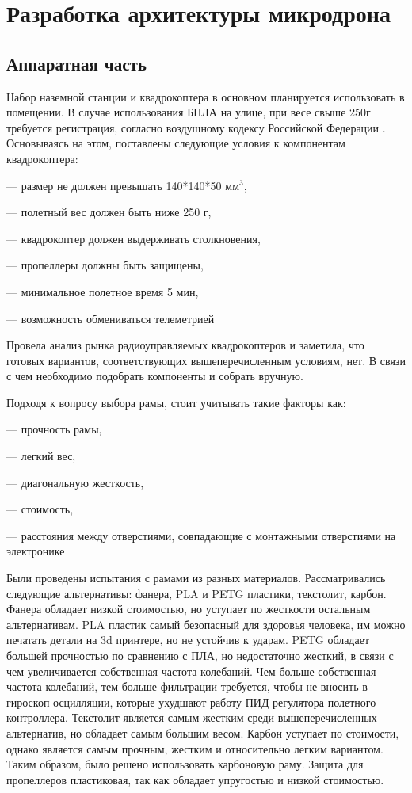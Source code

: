 
\section{Разработка архитектуры микродрона}
\subsection{Аппаратная часть}

Набор наземной станции и квадрокоптера в основном планируется использовать в помещении. В случае использования БПЛА на улице, при весе свыше 250г требуется регистрация, согласно воздушному кодексу Российской Федерации\cite{ivp} . Основываясь на этом, поставлены следующие условия к компонентам квадрокоптера:

--- размер не должен превышать 140*140*50 \(мм^3\),

--- полетный вес должен быть ниже 250 г,

--- квадрокоптер должен выдерживать столкновения,

--- пропеллеры должны быть защищены,

--- минимальное полетное время 5 мин,

--- возможность обмениваться телеметрией

Провела анализ рынка радиоуправляемых квадрокоптеров и заметила, что готовых вариантов, соответствующих вышеперечисленным условиям, нет. В связи с чем необходимо подобрать компоненты и собрать вручную.

Подходя к вопросу выбора рамы, стоит учитывать такие факторы как:

--- прочность рамы,

--- легкий вес,

--- диагональную жесткость,

--- стоимость,

--- расстояния между отверстиями, совпадающие с монтажными отверстиями на электронике

Были проведены испытания с рамами из разных материалов. Рассматривались следующие альтернативы: фанера, PLA и PETG пластики, текстолит, карбон. Фанера обладает низкой стоимостью, но уступает по жесткости остальным альтернативам. PLA пластик самый безопасный для здоровья человека, им можно печатать детали на 3d принтере, но не устойчив к ударам. PETG обладает большей прочностью по сравнению с ПЛА, но недостаточно жесткий, в связи с чем увеличивается собственная частота колебаний. Чем больше собственная частота колебаний, тем больше фильтрации требуется, чтобы не вносить в гироскоп осцилляции, которые ухудшают работу ПИД регулятора полетного контроллера. Текстолит является самым жестким среди вышеперечисленных альтернатив, но обладает самым большим весом. Карбон уступает по стоимости, однако является самым прочным, жестким и относительно легким вариантом. Таким образом, было решено использовать карбоновую раму.
Защита для пропеллеров пластиковая, так как обладает упругостью и низкой стоимостью.

